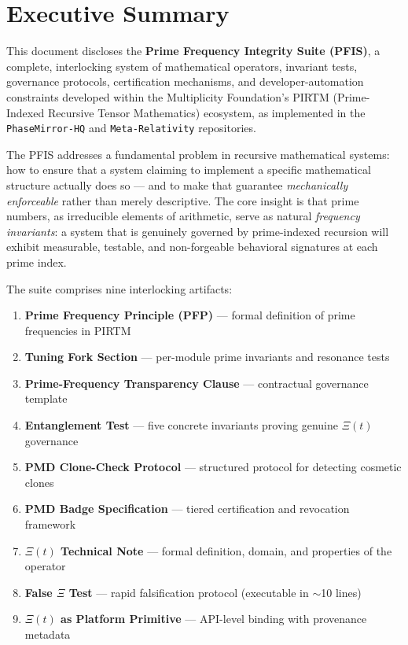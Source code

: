 \documentclass[12pt,letterpaper]{article}
\theoremstyle{definition}
\theoremstyle{remark}
\begin{document}
\tableofcontents
\newpage

\section{Executive Summary}

This document discloses the \textbf{Prime Frequency Integrity Suite (PFIS)}, a complete, interlocking system of mathematical operators, invariant tests, governance protocols, certification mechanisms, and developer-automation constraints developed within the Multiplicity Foundation's PIRTM (Prime-Indexed Recursive Tensor Mathematics) ecosystem, as implemented in the \texttt{PhaseMirror-HQ} and \texttt{Meta-Relativity} repositories.

The PFIS addresses a fundamental problem in recursive mathematical systems: how to ensure that a system claiming to implement a specific mathematical structure actually does so --- and to make that guarantee \emph{mechanically enforceable} rather than merely descriptive. The core insight is that prime numbers, as irreducible elements of arithmetic, serve as natural \emph{frequency invariants}: a system that is genuinely governed by prime-indexed recursion will exhibit measurable, testable, and non-forgeable behavioral signatures at each prime index.

The suite comprises nine interlocking artifacts:
\begin{enumerate}[noitemsep]
\item \textbf{Prime Frequency Principle (PFP)} --- formal definition of prime frequencies in PIRTM
\item \textbf{Tuning Fork Section} --- per-module prime invariants and resonance tests
\item \textbf{Prime-Frequency Transparency Clause} --- contractual governance template
\item \textbf{Entanglement Test} --- five concrete invariants proving genuine $\Xi(t)$ governance
\item \textbf{PMD Clone-Check Protocol} --- structured protocol for detecting cosmetic clones
\item \textbf{PMD Badge Specification} --- tiered certification and revocation framework
\item \textbf{$\Xi(t)$ Technical Note} --- formal definition, domain, and properties of the operator
\item \textbf{False $\Xi$ Test} --- rapid falsification protocol (executable in $\sim$10 lines)
\item \textbf{$\Xi(t)$ as Platform Primitive} --- API-level binding with provenance metadata
\end{enumerate}
\end{document}
